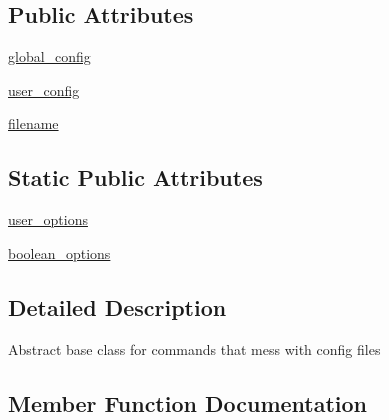 \subsection*{Public Attributes}
\begin{DoxyCompactItemize}
\item 
\hyperlink{classsetuptools_1_1command_1_1setopt_1_1option__base_a84a54e15422a6d7d41046ea769a7b061}{global\+\_\+config}
\item 
\hyperlink{classsetuptools_1_1command_1_1setopt_1_1option__base_abf3e8d8871be902ab84f02921b83b0e1}{user\+\_\+config}
\item 
\hyperlink{classsetuptools_1_1command_1_1setopt_1_1option__base_aa51e1c6a8c29785f328ecc8abafb7895}{filename}
\end{DoxyCompactItemize}
\subsection*{Static Public Attributes}
\begin{DoxyCompactItemize}
\item 
\hyperlink{classsetuptools_1_1command_1_1setopt_1_1option__base_a18ec73309f28690ca2d84069308cfc3e}{user\+\_\+options}
\item 
\hyperlink{classsetuptools_1_1command_1_1setopt_1_1option__base_a286dca4e0d14105a8f5501d69a818dbd}{boolean\+\_\+options}
\end{DoxyCompactItemize}


\subsection{Detailed Description}
\begin{DoxyVerb}Abstract base class for commands that mess with config files\end{DoxyVerb}
 

\subsection{Member Function Documentation}
\mbox{\label{classsetuptools_1_1command_1_1setopt_1_1option__base_a20bf2d2ef02bd4b89cfdee7dd3be8805}} 

